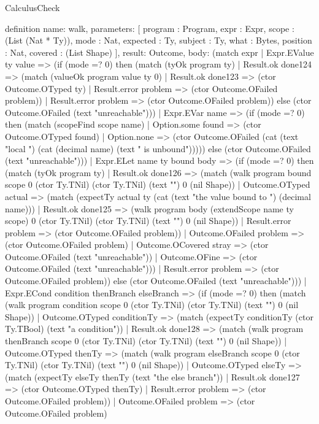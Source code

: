 \begin{lexlean}{CalculusCheck}
\begin{semanticmodule}
definition{
  name: walk,
  parameters: [
    program : Program,
    expr : Expr,
    scope : (List (Nat * Ty)),
    mode : Nat,
    expected : Ty,
    subject : Ty,
    what : Bytes,
    position : Nat,
    covered : (List Shape)
  ],
  result: Outcome,
  body: (match expr
    | Expr.EValue ty value => (if (mode =? 0) then (match (tyOk program ty)
      | Result.ok done124 => (match (valueOk program value ty 0)
        | Result.ok done123 => (ctor Outcome.OTyped ty)
        | Result.error problem => (ctor Outcome.OFailed problem))
      | Result.error problem => (ctor Outcome.OFailed problem)) else (ctor Outcome.OFailed (text "unreachable")))
    | Expr.EVar name => (if (mode =? 0) then (match (scopeFind scope name)
      | Option.some found => (ctor Outcome.OTyped found)
      | Option.none => (ctor Outcome.OFailed (cat (text "local ") (cat (decimal name) (text " is unbound"))))) else (ctor Outcome.OFailed (text "unreachable")))
    | Expr.ELet name ty bound body => (if (mode =? 0) then (match (tyOk program ty)
      | Result.ok done126 => (match (walk program bound scope 0 (ctor Ty.TNil) (ctor Ty.TNil) (text "") 0 (nil Shape))
        | Outcome.OTyped actual => (match (expectTy actual ty (cat (text "the value bound to ") (decimal name)))
          | Result.ok done125 => (walk program body (extendScope name ty scope) 0 (ctor Ty.TNil) (ctor Ty.TNil) (text "") 0 (nil Shape))
          | Result.error problem => (ctor Outcome.OFailed problem))
        | Outcome.OFailed problem => (ctor Outcome.OFailed problem)
        | Outcome.OCovered stray => (ctor Outcome.OFailed (text "unreachable"))
        | Outcome.OFine => (ctor Outcome.OFailed (text "unreachable")))
      | Result.error problem => (ctor Outcome.OFailed problem)) else (ctor Outcome.OFailed (text "unreachable")))
    | Expr.ECond condition thenBranch elseBranch => (if (mode =? 0) then (match (walk program condition scope 0 (ctor Ty.TNil) (ctor Ty.TNil) (text "") 0 (nil Shape))
      | Outcome.OTyped conditionTy => (match (expectTy conditionTy (ctor Ty.TBool) (text "a condition"))
        | Result.ok done128 => (match (walk program thenBranch scope 0 (ctor Ty.TNil) (ctor Ty.TNil) (text "") 0 (nil Shape))
          | Outcome.OTyped thenTy => (match (walk program elseBranch scope 0 (ctor Ty.TNil) (ctor Ty.TNil) (text "") 0 (nil Shape))
            | Outcome.OTyped elseTy => (match (expectTy elseTy thenTy (text "the else branch"))
              | Result.ok done127 => (ctor Outcome.OTyped thenTy)
              | Result.error problem => (ctor Outcome.OFailed problem))
            | Outcome.OFailed problem => (ctor Outcome.OFailed problem)
}
\end{semanticmodule}
\end{lexlean}
